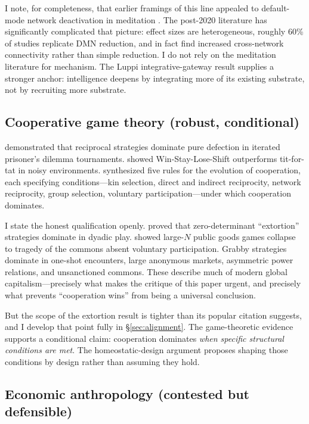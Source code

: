 \documentclass[11pt,a4paper,twocolumn]{article}
\begin{document}
I note, for completeness, that earlier framings of this line appealed
to default-mode network deactivation in meditation
\citep{brewer2011,garrison2015}. The post-2020 literature
\citep{vandam2018,rahrig2022,ganesan2022} has significantly complicated
that picture: effect sizes are heterogeneous, roughly 60\% of studies
replicate DMN reduction, and \citet{rahrig2022} in fact find increased
cross-network connectivity rather than simple reduction. I do not rely
on the meditation literature for mechanism. The Luppi integrative-gateway
result supplies a stronger anchor: intelligence deepens by integrating
more of its existing substrate, not by recruiting more substrate.

\subsection{Cooperative game theory (robust, conditional)}

\citet{axelrod1984} demonstrated that reciprocal strategies dominate
pure defection in iterated prisoner's dilemma tournaments.
\citet{nowak1993} showed Win-Stay-Lose-Shift outperforms tit-for-tat in
noisy environments. \citet{nowak2006} synthesized five rules for the
evolution of cooperation, each specifying conditions---kin selection,
direct and indirect reciprocity, network reciprocity, group selection,
voluntary participation---under which cooperation dominates.

I state the honest qualification openly. \citet{press2012} proved that
zero-determinant ``extortion'' strategies dominate in dyadic play.
\citet{hauert2002} showed large-$N$ public goods games collapse to
tragedy of the commons absent voluntary participation. Grabby strategies
dominate in one-shot encounters, large anonymous markets, asymmetric
power relations, and unsanctioned commons. These describe much of modern
global capitalism---precisely what makes the critique of this paper
urgent, and precisely what prevents ``cooperation wins'' from being a
universal conclusion.

But the scope of the extortion result is tighter than its popular
citation suggests, and I develop that point fully in
\S\ref{sec:alignment}. The game-theoretic evidence supports a conditional
claim: cooperation dominates \emph{when specific structural conditions
are met}. The homeostatic-design argument proposes shaping those
conditions by design rather than assuming they hold.

\subsection{Economic anthropology (contested but defensible)}
\end{document}
